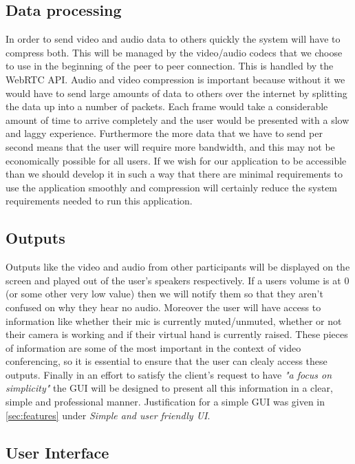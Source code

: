 \subsection{Data processing}

In order to send video and audio data to others quickly the 
system will have to compress both. This will be managed by the
video/audio codecs that we choose to use in the beginning of
the peer to peer connection. This is handled by the
WebRTC API. Audio and video compression is 
important because without it we would have to send large 
amounts of data to others over the internet by splitting the
data up into a number of packets. Each frame would take a 
considerable amount of time to arrive completely and the user
would be presented with a slow and laggy experience.
Furthermore the more data that we have to send per second 
means that the user will require more bandwidth, and this 
may not be economically possible for all users. If we wish 
for our application to be accessible than we should develop it
in such a way that there are minimal requirements to use the 
application smoothly and compression will certainly reduce the
system requirements needed to run this application.

\subsection{Outputs}

Outputs like the video and audio from other participants will 
be displayed on the screen and played out of the user's 
speakers respectively. If a users volume is at 0 (or some 
other very low value) then we will 
notify them so that they aren't confused on why they hear no 
audio. Moreover the user will have access to 
information like whether their mic is currently muted/unmuted,
whether or not their camera is working and if their virtual 
hand is currently raised. These pieces of information are
some of the most important in the context of video
conferencing, so it is essential to ensure that the user can 
clealy access these outputs. Finally in an effort to satisfy
the client's request to have \textit{"a focus on simplicity"}
the GUI will be designed to present all this information in a
clear, simple and professional manner. Justification for a
simple GUI was given in \ref{sec:features} under 
\textit{Simple and user friendly UI}.

\subsection{User Interface}

